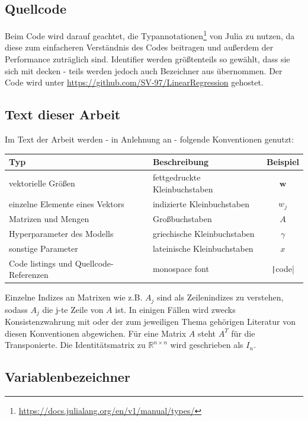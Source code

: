 \documentclass{article}
\theoremstyle{plain} %
\theoremstyle{definition} %
\begin{document}
\subsection{Quellcode}
Beim Code wird darauf geachtet, die Typannotationen\footnote{\url{https://docs.julialang.org/en/v1/manual/types/}} von Julia zu nutzen, da diese zum einfacheren Verständnis des Codes beitragen und außerdem der Performance zuträglich sind.
Identifier werden größtenteils so gewählt, dass sie sich mit \cite{Bishop} decken - teils werden jedoch auch Bezeichner aus \cite{Lippe} übernommen. Der Code wird unter \url{https://github.com/SV-97/LinearRegression} gehostet.

\subsection{Text dieser Arbeit}
Im Text der Arbeit werden - in Anlehnung an \cite{Bishop} - folgende Konventionen genutzt:

\begin{tabular}{llc}
  \toprule
  Typ & Beschreibung & Beispiel \\
  \midrule
  vektorielle Größen & fettgedruckte Kleinbuchstaben & $\mathbf{w}$ \\
  einzelne Elemente eines Vektors & indizierte Kleinbuchstaben & $w_j$ \\
  Matrizen und Mengen & Großbuchstaben & $A$ \\
  Hyperparameter des Modells & griechische Kleinbuchstaben & $\gamma$ \\
  sonstige Parameter & lateinische Kleinbuchstaben & $x$ \\
  Code listings und Quellcode-Referenzen & monospace font & \texttt|code| \\
\end{tabular}

Einzelne Indizes an Matrixen wie z.B. $A_j$ sind als Zeilenindizes zu verstehen, sodass $A_j$ die j-te Zeile von $A$ ist.
In einigen Fällen wird zwecks Konsistenzwahrung mit \cite{Bishop} oder der zum jeweiligen Thema gehörigen Literatur von diesen Konventionen abgewichen.
Für eine Matrix $A$ steht $A^T$ für die Transponierte. Die Identitätsmatrix zu $\mathbb{R}^{n \times n}$ wird geschrieben als $I_n$.

\subsection{Variablenbezeichner}
\end{document}
